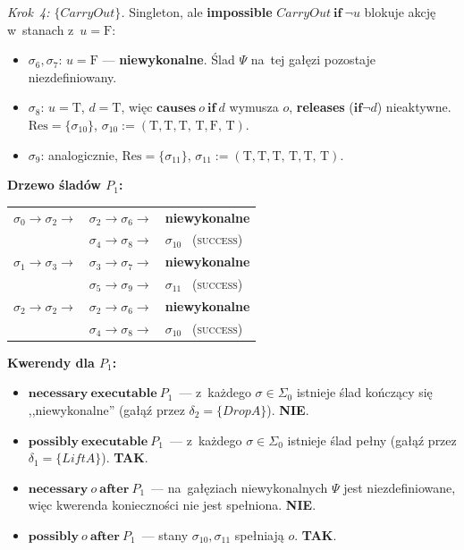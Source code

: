 \documentclass[11pt,a4paper]{article}
\newcommand{\causes}{\textbf{causes}}
\newcommand{\aft}{\textbf{after}}
\renewcommand{\iff}{\textbf{if}}
\newcommand{\impossible}{\textbf{impossible}}
\newcommand{\releases}{\textbf{releases}}
\newcommand{\necessary}{\textbf{necessary}}
\newcommand{\possibly}{\textbf{possibly}}
\newcommand{\executable}{\textbf{executable}}
\theoremstyle{definition}
\begin{document}
\medskip
\noindent\textit{Krok~4: $\{\mathit{CarryOut}\}$.}
Singleton, ale \impossible{} $\mathit{CarryOut}\ \iff\ \neg u$
blokuje akcję w~stanach z~$u = \text{F}$:
\begin{itemize}[topsep=2pt]
  \item $\sigma_6, \sigma_7$: $u = \text{F}$ --- \textbf{niewykonalne}.
        Ślad $\Psi$ na~tej gałęzi pozostaje niezdefiniowany.
  \item $\sigma_8$: $u = \text{T}$, $d = \text{T}$, więc $\causes\ o\ \iff\ d$ wymusza $o$,
        \releases{} ($\iff \neg d$) nieaktywne. $\mathrm{Res} = \{\sigma_{10}\}$,
        $\sigma_{10} := (\text{T},\text{T},\text{T},\,\text{T},\text{F},\,\text{T})$.
  \item $\sigma_9$: analogicznie, $\mathrm{Res} = \{\sigma_{11}\}$,
        $\sigma_{11} := (\text{T},\text{T},\text{T},\,\text{T},\text{T},\,\text{T})$.
\end{itemize}

\medskip
\noindent\textbf{Drzewo śladów $P_1$:}
\begin{center}
\begin{tabular}{@{}l@{\ }c@{\ }l@{}}
$\sigma_0 \to \sigma_2 \to$ & $\sigma_2 \to \sigma_6 \to$ & \textbf{niewykonalne} \\
                            & $\sigma_4 \to \sigma_8 \to$ & $\sigma_{10}$ \ (\textsc{success}) \\[2pt]
$\sigma_1 \to \sigma_3 \to$ & $\sigma_3 \to \sigma_7 \to$ & \textbf{niewykonalne} \\
                            & $\sigma_5 \to \sigma_9 \to$ & $\sigma_{11}$ \ (\textsc{success}) \\[2pt]
$\sigma_2 \to \sigma_2 \to$ & $\sigma_2 \to \sigma_6 \to$ & \textbf{niewykonalne} \\
                            & $\sigma_4 \to \sigma_8 \to$ & $\sigma_{10}$ \ (\textsc{success}) \\
\end{tabular}
\end{center}

\medskip
\noindent\textbf{Kwerendy dla $P_1$:}
\begin{itemize}
  \item $\necessary\ \executable\ P_1$~---
    z~każdego $\sigma \in \Sigma_0$ istnieje ślad kończący się ,,niewykonalne''
    (gałąź przez $\delta_2 = \{\mathit{DropA}\}$). \textbf{NIE}.

  \item $\possibly\ \executable\ P_1$~---
    z~każdego $\sigma \in \Sigma_0$ istnieje ślad pełny
    (gałąź przez $\delta_1 = \{\mathit{LiftA}\}$). \textbf{TAK}.

  \item $\necessary\ o\ \aft\ P_1$~---
    na~gałęziach niewykonalnych $\Psi$ jest niezdefiniowane, więc kwerenda
    konieczności nie jest spełniona. \textbf{NIE}.

  \item $\possibly\ o\ \aft\ P_1$~---
    stany $\sigma_{10}, \sigma_{11}$ spełniają $o$. \textbf{TAK}.
\end{itemize}
\end{document}
